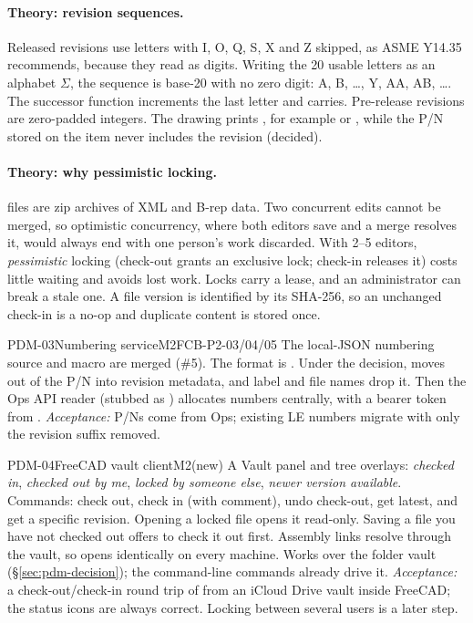 \paragraph{Theory: revision sequences.} Released revisions use letters with I, O, Q, S, X and Z skipped,
as ASME Y14.35 recommends, because they read as digits. Writing the 20 usable letters as an alphabet
$\Sigma$, the sequence is base-20 with no zero digit: A, B, \ldots, Y, AA, AB, \ldots. The successor
function increments the last letter and carries. Pre-release revisions are zero-padded integers. The drawing
prints , for example  or , while the P/N
stored on the item never includes the revision (decided).

\paragraph{Theory: why pessimistic locking.}  files are zip archives of XML and B-rep data. Two
concurrent edits cannot be merged, so optimistic concurrency, where both editors save and a merge resolves
it, would always end with one person's work discarded. With 2--5 editors, \emph{pessimistic} locking (check-out
grants an exclusive lock; check-in releases it) costs little waiting and avoids lost work. Locks carry a lease,
and an administrator can break a stale one. A file version is identified by its SHA-256, so an unchanged
check-in is a no-op and duplicate content is stored once.

\begin{epic}{PDM-03}{Numbering service}{M2}{\stProg}{FCB-P2-03/04/05}
The local-JSON numbering source and macro are merged (\#5). The format is
. Under the decision,  moves out of the P/N into
revision metadata, and label and file names drop it. Then the Ops API reader (stubbed as
) allocates numbers centrally, with a bearer token from .
\emph{Acceptance:} P/Ns come from Ops; existing LE numbers migrate with only the revision suffix removed.
\end{epic}

\begin{epic}{PDM-04}{FreeCAD vault client}{M2}{\stTodo}{(new)}
A Vault panel and tree overlays: \emph{checked in}, \emph{checked out by me}, \emph{locked by someone
else}, \emph{newer version available}. Commands: check out, check in (with comment), undo check-out, get
latest, and get a specific revision. Opening a locked file opens it read-only. Saving a file you have not
checked out offers to check it out first. Assembly links resolve through the vault, so 
opens identically on every machine.
Works over the folder vault (\S\ref{sec:pdm-decision}); the command-line  commands already
drive it.
\emph{Acceptance:} a check-out/check-in round trip of  from an iCloud Drive vault inside FreeCAD;
the status icons are always correct. Locking between several users is a later step.
\end{epic}

